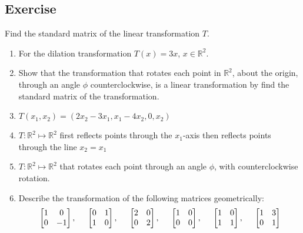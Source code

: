 \documentclass[aima104_lecturenotes_ku.tex]{subfiles}
\begin{document}
\subsection{Exercise}
Find the standard matrix of the linear transformation $T$.
\begin{enumerate}
\item For the dilation transformation $T(x)=3x$, $x \in \mathbb{R}^2$.

\item Show that the transformation that rotates each point in $\mathbb{R}^2$, about the origin, through an angle $\phi$ counterclockwise, is a linear transformation by find the standard matrix of the transformation.

\item $T(x_1,x_2) = (2x_2-3x_1, x_1-4x_2, 0, x_2) $
\item $T:\mathbb{R} ^2 \mapsto \mathbb{R} ^2$ first reflects points through the $x_1$-axis then reflects points through the line $x_2 = x_1$
\item $T:\mathbb{R} ^2 \mapsto \mathbb{R} ^2$ that rotates each point through an angle $\phi$, with counterclockwise rotation.

\item Describe the transformation of the following matrices geometrically:
  $$\begin{bmatrix}
    1 & 0\\
    0 & -1
  \end{bmatrix}, \hspace{5mm} \begin{bmatrix}
    0 & 1 \\
    1 & 0
  \end{bmatrix}, \hspace{5mm} \begin{bmatrix}
    2 & 0 \\
    0 & 2
  \end{bmatrix}, \hspace{5mm} \begin{bmatrix}
    1 & 0 \\
    0 & 0
  \end{bmatrix}, \hspace{5mm} \begin{bmatrix}
    1 & 0 \\
    1 & 1
  \end{bmatrix}, \hspace{5mm} \begin{bmatrix}
    1 & 3 \\
    0 & 1
  \end{bmatrix}$$
\end{enumerate}
\end{document}
